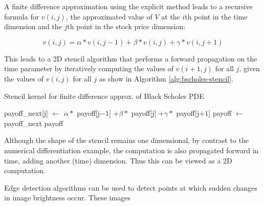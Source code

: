 A finite difference approximation using the explicit method leads to a
recursive formula \cite{blackscholes} for $v(i, j)$, the approximated
value of $V$ at the $i$th point in the time dimension and the $j$th
point in the stock price dimension:

\begin{equation}
  v(i, j) =
  \alpha * v(i, j - 1) +
  \beta  * v(i, j) +
  \gamma * v(i, j + 1)
\end{equation}

This leads to a 2D stencil algorithm that performs a forward
propagation on the time parameter by iteratively computing the values
of $v(i + 1, j)$ for all $j$, given the values of $v(i, j)$ for all
$j$ as show in Algorithm \ref{alg:bscholes-stencil}.

\begin{algorithm}
  \caption{Stencil kernel for finite difference approx. of Black Scholes PDE}
  \label{alg:bscholes-stencil}
  \begin{algorithmic}
    \State payoff\_next[j] $\gets$ $\alpha *$ payoff[j$ -1$] $+ \beta *$ payoff[j] $ + \gamma * $ payoff[j$ + 1$]
    \EndFor
    \State payoff $\gets$ payoff\_next
    \EndFor
    \State \Return payoff
    \EndFunction
  \end{algorithmic}
\end{algorithm}

Although the shape of the stencil remains one dimensional, by contrast to
the numerical differentiation example, the computation is also
propagated forward in time, adding another (time) dimension. Thus this
can be viewed as a 2D computation.


Edge detection algorithms can be used to detect points at which sudden
changes in image brightness occur. These images

